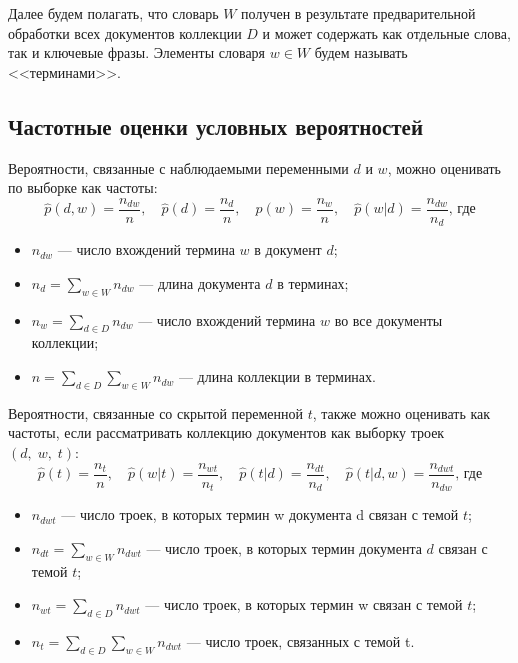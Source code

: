 \documentclass[article, 10pt]{disser}
\begin{document}
Далее будем полагать, что словарь $W$ получен в результате предварительной обработки всех документов коллекции $D$ и может содержать как отдельные слова, так и ключевые фразы. Элементы словаря $w \in W$ будем называть <<терминами>>.

\subsection{Частотные оценки условных вероятностей}
Вероятности, связанные с наблюдаемыми переменными $d$ и $w$, можно оценивать по выборке как частоты:
\begin{equation*}
    \hat{p}(d, w) = \frac{n_{dw}}{n},\quad \hat{p}(d) = \frac{n_{d}}{n},\quad \hat{p}(w) = \frac{n_{w}}{n},\quad \hat{p}(w | d) = \frac{n_{dw}}{n_{d}} \text{, где}
\end{equation*}
\begin{itemize}
    \item $n_{dw}$ --- число вхождений термина $w$ в документ $d$;
    \item $n_d = \sum\limits_{w \in W}n_{dw}$ --- длина документа $d$ в терминах;
    \item $n_w = \sum\limits_{d \in D}n_{dw}$ --- число вхождений термина $w$ во все документы коллекции;
    \item $n = \sum\limits_{d \in D}\sum\limits_{w \in W}n_{dw}$ --- длина коллекции в терминах.
\end{itemize}

Вероятности, связанные со скрытой переменной $t$, также можно оценивать как частоты, если рассматривать коллекцию документов как выборку троек $(d,\; w,\; t)$:
\begin{equation*}
    \hat{p}(t) = \frac{n_{t}}{n},\quad \hat{p}(w |t) = \frac{n_{wt}}{n_t},\quad \hat{p}(t| d) = \frac{n_{dt}}{n_d},\quad \hat{p}(t| d, w) = \frac{n_{dwt}}{n_{dw}} \text{, где}
\end{equation*}
\begin{itemize}
    \item $n_{dwt}$ --- число троек, в которых термин w документа d связан с темой $t$;
    \item $n_{dt} = \sum\limits_{w \in W}n_{dwt}$ --- число троек, в которых термин документа $d$ связан с темой $t$;
    \item $n_{wt} = \sum\limits_{d \in D}n_{dwt}$ --- число троек, в которых термин w связан с темой $t$;
    \item $n_t = \sum\limits_{d \in D}\sum\limits_{w \in W}n_{dwt}$ --- число троек, связанных с темой t.
\end{itemize}
\end{document}
